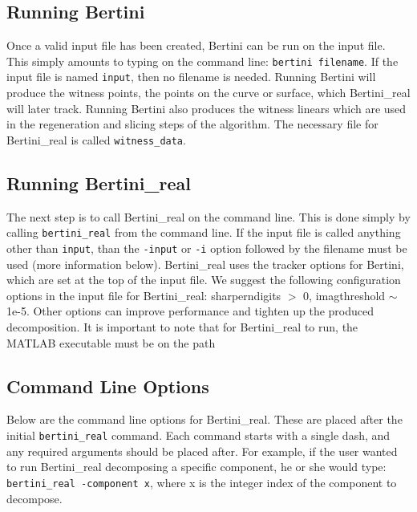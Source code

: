 \documentclass[10pt]{article}
\begin{document}
\subsection{Running Bertini}
Once a valid input file has been created, Bertini can be run on the input file. This simply amounts to typing on the command line: \texttt{bertini filename}. If the input file is named \texttt{input}, then no filename is needed. Running Bertini will produce the witness points, the points on the curve or surface, which Bertini\_real will later track. Running Bertini also produces the witness linears which are used in the regeneration and slicing steps of the algorithm. The necessary file for Bertini\_real is called \texttt{witness\_data}. 


\subsection{Running Bertini\_real}
The next step is to call Bertini\_real on the command line. This is done simply by calling \texttt{bertini\_real} from the command line. If the input file is called anything other than \texttt{input}, than the \texttt{-input} or \texttt{-i} option followed by the filename must be used (more information below). Bertini\_real uses the tracker options for Bertini, which are set at the top of the input file. We suggest the following configuration options in the input file for Bertini\_real: sharperndigits $>$ 0, imagthreshold $\sim$ 1e-5. Other options can improve performance and tighten up the produced decomposition.
It is important to note that for Bertini\_real to run, the MATLAB executable must be on the path

\subsection{Command Line Options}
Below are the command line options for Bertini\_real. These are placed after the initial \texttt{bertini\_real} command. Each command starts with a single dash, and any required arguments should be placed after. For example, if the user wanted to run Bertini\_real decomposing a specific component, he or she would type: \texttt{bertini\_real -component x}, where x is the integer index of the component to decompose.
\end{document}
